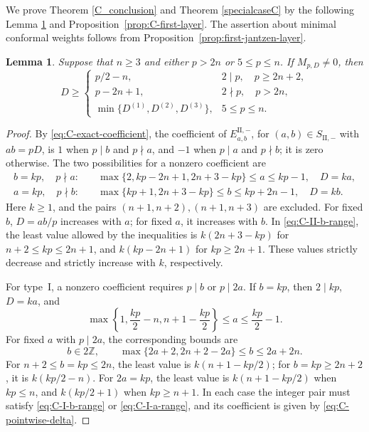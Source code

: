 \documentclass[11pt,a4paper]{amsart}
\newcommand{\ZZ}{\mathbb Z}
\theoremstyle{plain}
\newtheorem{lem}[theorem]{Lemma}
\numberwithin{equation}{section}
\newenvironment{pf}{\begin{proof}}{\end{proof}}
\begin{document}
We prove Theorem \ref{C_conclusion} and  Theorem \ref{specialcaseC} by the following Lemma \ref{lem:C-endpoint} and 
Proposition~\ref{prop:C-first-layer}. 
The assertion about minimal conformal weights follows from
Proposition~\ref{prop:first-jantzen-layer}.
\begin{lem}\label{lem:C-endpoint}
	Suppose that \(n\ge3\) and either \(p>2n\) or \(5\le p\le n\).
	If \(M_{p,D}\ne0\), then
	\[
	D\ge
	\begin{cases}
		p/2-n,&2\mid p,\quad p\ge2n+2,\\
		p-2n+1,&2\nmid p,\quad p>2n,\\
		\min\{D^{(1)},D^{(2)},D^{(3)}\},&5\le p\le n.
	\end{cases}
	\]
\end{lem}
\begin{pf}
	By \eqref{eq:C-exact-coefficient}, the coefficient of
	\(E_{a,b}^{\mathrm{II},-}\), for \((a,b)\in S_{\mathrm{II},-}\)
	with \(ab=pD\), is \(1\) when \(p\mid b\) and \(p\nmid a\),
	and \(-1\) when \(p\mid a\) and \(p\nmid b\); it is zero otherwise.
	The two possibilities for a nonzero coefficient are
	\begin{align}
		b=kp,\quad p\nmid a:
		&\quad \max\{2,kp-2n+1,2n+3-kp\}\le a\le kp-1,
		\quad D=ka,\label{eq:C-II-b-range}\\
		a=kp,\quad p\nmid b:
		&\quad \max\{kp+1,2n+3-kp\}\le b\le kp+2n-1,
		\quad D=kb.\label{eq:C-II-a-range}
	\end{align}
	Here \(k\ge1\), and the pairs \((n+1,n+2),(n+1,n+3)\) are
	excluded. For fixed \(b\), \(D=ab/p\) increases with \(a\);
	for fixed \(a\), it increases with \(b\). In
	\eqref{eq:C-II-b-range}, the least value allowed by the inequalities
	is \(k(2n+3-kp)\) for \(n+2\le kp\le2n+1\), and
	\(k(kp-2n+1)\) for \(kp\ge2n+1\). These values strictly decrease
	and strictly increase with \(k\), respectively.
	
	For type~\(\mathrm I\), a nonzero coefficient requires
	\(p\mid b\) or \(p\mid2a\). If \(b=kp\), then \(2\mid kp\),
	\(D=ka\), and
	\begin{equation}\label{eq:C-I-b-range}
		\max\left\{1,\frac{kp}{2}-n,n+1-\frac{kp}{2}\right\}
		\le a\le\frac{kp}{2}-1.
	\end{equation}
	For fixed \(a\) with \(p\mid2a\), the corresponding bounds are
	\begin{equation}\label{eq:C-I-a-range}
		b\in2\ZZ,\qquad
		\max\{2a+2,2n+2-2a\}\le b\le2a+2n.
	\end{equation}
	For \(n+2\le b=kp\le2n\), the least value is
	\(k(n+1-kp/2)\); for \(b=kp\ge2n+2\), it is
	\(k(kp/2-n)\). For \(2a=kp\), the least value is
	\(k(n+1-kp/2)\) when \(kp\le n\), and \(k(kp/2+1)\)
	when \(kp\ge n+1\). In each case the integer pair must satisfy
	\eqref{eq:C-I-b-range} or \eqref{eq:C-I-a-range}, and its coefficient
	is given by \eqref{eq:C-pointwise-delta}.
	

\end{pf}
\end{document}
